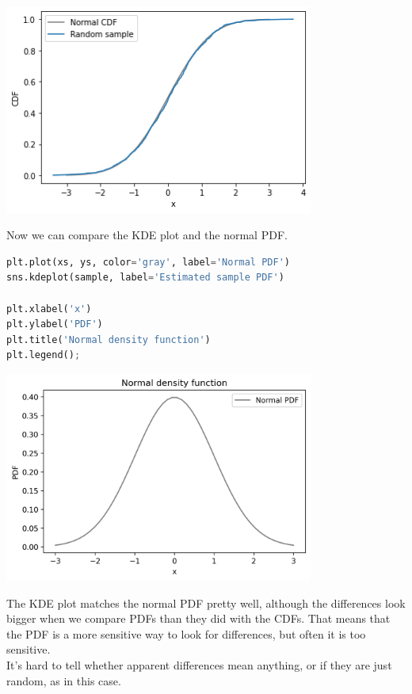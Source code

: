 \begin{center}
\includegraphics[width=4in]{chapters/08_distributions_files/08_distributions_116_0.png}
\end{center}

Now we can compare the KDE plot and the normal PDF.

\begin{lstlisting}[language=Python,style=source]
plt.plot(xs, ys, color='gray', label='Normal PDF')
sns.kdeplot(sample, label='Estimated sample PDF')

plt.xlabel('x')
plt.ylabel('PDF')
plt.title('Normal density function')
plt.legend();
\end{lstlisting}

\begin{center}
\includegraphics[width=4in]{chapters/08_distributions_files/08_distributions_118_0.png}
\end{center}

The KDE plot matches the normal PDF pretty well, although the
differences look bigger when we compare PDFs than they did with the
CDFs. That means that the PDF is a more sensitive way to look for
differences, but often it is too sensitive.\\
It's hard to tell whether apparent differences mean anything, or if they
are just random, as in this case.

